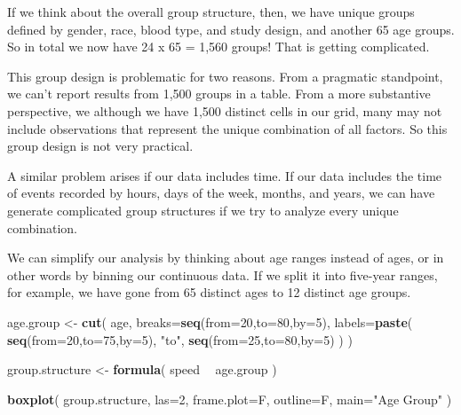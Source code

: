 \documentclass[]{book}
\newenvironment{Shaded}{\begin{snugshade}}{\end{snugshade}}
\newcommand{\DataTypeTok}[1]{\textcolor[rgb]{0.13,0.29,0.53}{#1}}
\newcommand{\DecValTok}[1]{\textcolor[rgb]{0.00,0.00,0.81}{#1}}
\newcommand{\KeywordTok}[1]{\textcolor[rgb]{0.13,0.29,0.53}{\textbf{#1}}}
\newcommand{\NormalTok}[1]{#1}
\newcommand{\OperatorTok}[1]{\textcolor[rgb]{0.81,0.36,0.00}{\textbf{#1}}}
\newcommand{\StringTok}[1]{\textcolor[rgb]{0.31,0.60,0.02}{#1}}
\theoremstyle{definition}
\theoremstyle{definition}
\theoremstyle{definition}
\theoremstyle{remark}
\begin{document}
If we think about the overall group structure, then, we have unique
groups defined by gender, race, blood type, and study design, and
another 65 age groups. So in total we now have 24 x 65 = 1,560 groups!
That is getting complicated.

This group design is problematic for two reasons. From a pragmatic
standpoint, we can't report results from 1,500 groups in a table. From a
more substantive perspective, we although we have 1,500 distinct cells
in our grid, many may not include observations that represent the unique
combination of all factors. So this group design is not very practical.

A similar problem arises if our data includes time. If our data includes
the time of events recorded by hours, days of the week, months, and
years, we can have generate complicated group structures if we try to
analyze every unique combination.

We can simplify our analysis by thinking about age ranges instead of
ages, or in other words by binning our continuous data. If we split it
into five-year ranges, for example, we have gone from 65 distinct ages
to 12 distinct age groups.

\begin{Shaded}
\begin{Highlighting}[]

\NormalTok{age.group <-}\StringTok{ }\KeywordTok{cut}\NormalTok{( age, }
                  \DataTypeTok{breaks=}\KeywordTok{seq}\NormalTok{(}\DataTypeTok{from=}\DecValTok{20}\NormalTok{,}\DataTypeTok{to=}\DecValTok{80}\NormalTok{,}\DataTypeTok{by=}\DecValTok{5}\NormalTok{),}
                  \DataTypeTok{labels=}\KeywordTok{paste}\NormalTok{( }\KeywordTok{seq}\NormalTok{(}\DataTypeTok{from=}\DecValTok{20}\NormalTok{,}\DataTypeTok{to=}\DecValTok{75}\NormalTok{,}\DataTypeTok{by=}\DecValTok{5}\NormalTok{), }\StringTok{"to"}\NormalTok{, }\KeywordTok{seq}\NormalTok{(}\DataTypeTok{from=}\DecValTok{25}\NormalTok{,}\DataTypeTok{to=}\DecValTok{80}\NormalTok{,}\DataTypeTok{by=}\DecValTok{5}\NormalTok{) ) )}

\NormalTok{group.structure <-}\StringTok{ }\KeywordTok{formula}\NormalTok{( speed }\OperatorTok{~}\StringTok{ }\NormalTok{age.group )}

\KeywordTok{boxplot}\NormalTok{( group.structure, }\DataTypeTok{las=}\DecValTok{2}\NormalTok{, }\DataTypeTok{frame.plot=}\NormalTok{F, }\DataTypeTok{outline=}\NormalTok{F, }\DataTypeTok{main=}\StringTok{"Age Group"}\NormalTok{  )}
\end{Highlighting}
\end{Shaded}
\end{document}
